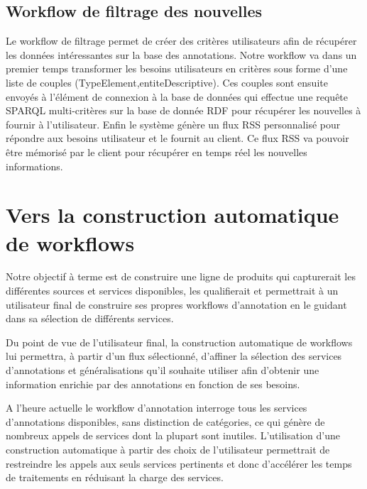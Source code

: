 \documentclass[]{easychair}
\begin{document}
\subsection{Workflow de filtrage des nouvelles}
Le workflow de filtrage permet de créer des critères utilisateurs afin de récupérer les données intéressantes sur la base des annotations. Notre workflow va dans un premier temps transformer les besoins utilisateurs en critères sous forme d'une liste de couples (TypeElement,entiteDescriptive). Ces couples sont ensuite envoyés à l'élément de connexion à la base de données qui effectue une requête SPARQL multi-critères sur la base de donnée RDF pour récupérer les nouvelles à fournir à l'utilisateur. Enfin le système génère un flux RSS personnalisé pour répondre aux besoins utilisateur et le fournit au client. Ce flux RSS va pouvoir être mémorisé par le client pour récupérer en temps réel les nouvelles informations.


\section{Vers la construction automatique de workflows }
\label{sect:perspectives}
Notre objectif à terme est de construire une ligne de produits qui capturerait les différentes sources et services disponibles, les qualifierait et permettrait à un utilisateur final de construire ses propres workflows d'annotation en le guidant dans sa sélection de différents services.

Du point de vue de l'utilisateur final, la construction automatique de workflows lui permettra, à partir d'un flux sélectionné, d'affiner la sélection des services d'annotations et généralisations qu'il souhaite utiliser afin d'obtenir une information enrichie par des annotations en fonction de ses besoins. 

A l'heure actuelle le workflow d'annotation interroge tous les services d'annotations disponibles, sans distinction de catégories, ce qui génère de nombreux appels de services dont la plupart sont inutiles. L'utilisation d'une construction automatique à partir des choix de l'utilisateur permettrait de restreindre les appels aux seuls services pertinents et donc d'accélérer les temps de traitements en réduisant la charge des services. 
\end{document}
